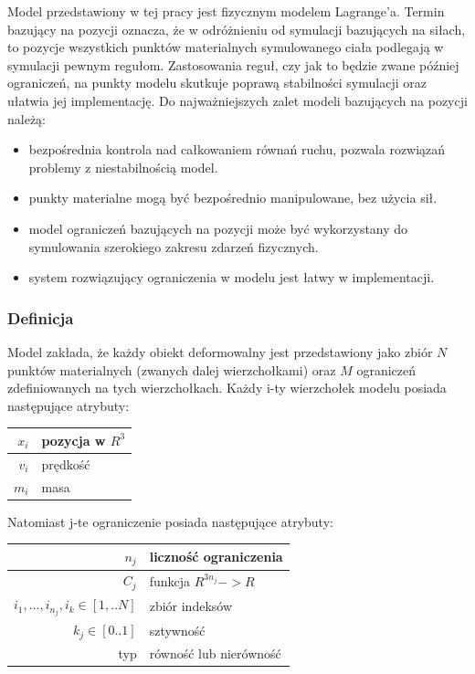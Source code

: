 Model przedstawiony w tej pracy jest fizycznym modelem Lagrange'a. Termin
bazujący na pozycji oznacza, że w odróżnieniu od symulacji bazujących na siłach, to pozycje
wszystkich punktów materialnych symulowanego ciała podlegają w symulacji pewnym
regułom. Zastosowania reguł, czy jak to będzie zwane później ograniczeń, na
punkty modelu skutkuje poprawą stabilności symulacji oraz ułatwia jej
implementację. Do najważniejszych zalet modeli bazujących na pozycji należą:
\begin{itemize}
	\item bezpośrednia kontrola nad całkowaniem równań ruchu, pozwala rozwiązań
	problemy z niestabilnością model.
	\item punkty materialne mogą być bezpośrednio manipulowane, bez użycia sił.
	\item model ograniczeń bazujących na pozycji może być wykorzystany do
	symulowania szerokiego zakresu zdarzeń fizycznych.
	\item system rozwiązujący ograniczenia w modelu jest łatwy w implementacji.
\end{itemize}

\subsubsection{Definicja}
Model zakłada, że każdy obiekt deformowalny jest przedstawiony jako zbiór $N$
punktów materialnych (zwanych dalej wierzchołkami) oraz $M$ ograniczeń
zdefiniowanych na tych wierzchołkach. Każdy i-ty wierzchołek modelu posiada
następujące atrybuty:

\begin{tabular}{|r|l|}
\hline
$x_i$ & pozycja w $R^3$ \\
\hline
$v_i$ & prędkość \\
\hline
$m_i$ & masa\\
\hline
\end{tabular}

Natomiast j-te ograniczenie posiada następujące atrybuty:

\begin{tabular}{|r|l|}
\hline
$n_j$ & liczność ograniczenia \\
\hline
$C_j$ & funkcja $R^{3n_j} -> R$\\
\hline
${i_1, ..., i_{n_j}}, i_k \in [1,..N]$ & zbiór indeksów\\
\hline
$k_j \in [0.. 1]$ & sztywność\\
\hline
typ & równość lub nierówność\\
\hline
\end{tabular}

